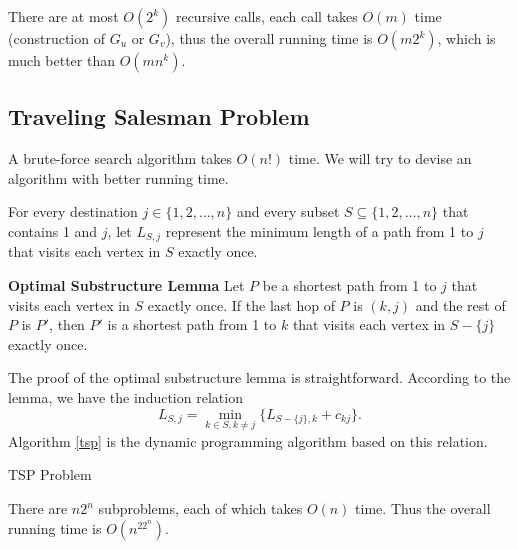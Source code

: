 There are at most $O(2^k)$ recursive calls, each call takes $O(m)$ time (construction of $G_u$ or $G_v$), thus the overall running time is $O(m2^k)$, which is much better than $O(mn^k)$.

\subsection{Traveling Salesman Problem}
A brute-force search algorithm takes $O(n!)$ time. We will try to devise an algorithm with better running time. 

For every destination $j\in\{1,2,\dots,n\}$ and every subset $S\subseteq\{1,2,\dots,n\}$ that contains 1 and $j$, let $L_{S,j}$ represent the minimum length of a path from 1 to $j$ that visits each vertex in $S$ exactly once.
\begin{lemma}\textbf{Optimal Substructure Lemma}
Let $P$ be a shortest path from 1 to $j$ that visits each vertex in $S$ exactly once. If the last hop of $P$ is $(k,j)$ and the rest of $P$ is $P'$, then $P'$ is a shortest path from 1 to $k$ that visits each vertex in $S-\{j\}$ exactly once. 
\end{lemma}
The proof of the optimal substructure lemma is straightforward. According to the lemma, we have the induction relation
$$L_{S,j}=\min_{k\in S,k\neq j}\{L_{S-\{j\},k}+c_{kj}\}.$$
Algorithm \ref{tsp} is the dynamic programming algorithm based on this relation.
\begin{algorithm}[ht]
\caption{TSP Problem}\label{tsp}
\begin{algorithmic}[1]
\EndFor\EndFor\EndFor
{}
\end{algorithmic}
\end{algorithm}
There are $n2^n$ subproblems, each of which takes $O(n)$ time. Thus the overall running time is $O(n^22^n)$.
\ifx\PREAMBLE\undefined

\fi